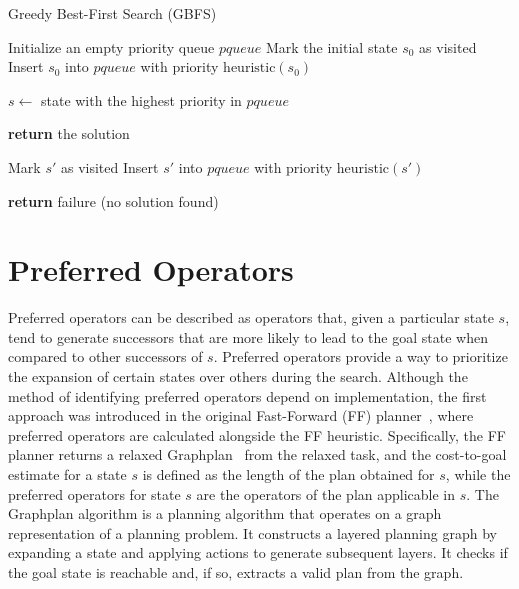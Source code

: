 \documentclass[ppgc,diss,english]{iiufrgs}
\begin{document}
\begin{algorithm}
\caption{Greedy Best-First Search (GBFS)}
\label{alg:gbfs}
\begin{algorithmic}[1]
  \State Initialize an empty priority queue $pqueue$
  \State Mark the initial state $s_0$ as visited
  \State Insert $s_0$ into $pqueue$ with priority $\text{heuristic}(s_0)$

    \State $s \gets$ state with the highest priority in $pqueue$

      \State \textbf{return} the solution
    \EndIf

        \State Mark $s'$ as visited
        \State Insert $s'$ into $pqueue$ with priority $\text{heuristic}(s')$
      \EndIf
    \EndFor
  \EndWhile

  \State \textbf{return} failure (no solution found)
\EndProcedure
\end{algorithmic}
\end{algorithm}

\section{Preferred Operators}
\label{sec:background-preferred-operators}
Preferred operators can be described as operators that, given a particular state $s$, tend to generate successors that are more likely to lead to the goal state when compared to other successors of $s$. Preferred operators provide a way to prioritize the expansion of certain states over others during the search. Although the method of identifying preferred operators depend on implementation, the first approach was introduced in the original Fast-Forward (FF) planner~\cite{Hoffmann.Nebel/2001}, where preferred operators are calculated alongside the FF heuristic. Specifically, the FF planner returns a relaxed Graphplan~\cite{Blum.etal/1997} from the relaxed task, and the cost-to-goal estimate for a state $s$ is defined as the length of the plan obtained for $s$, while the preferred operators for state $s$ are the operators of the plan applicable in $s$. The Graphplan algorithm is a planning algorithm that operates on a graph representation of a planning problem. It constructs a layered planning graph by expanding a state and applying actions to generate subsequent layers. It checks if the goal state is reachable and, if so, extracts a valid plan from the graph.
\end{document}

